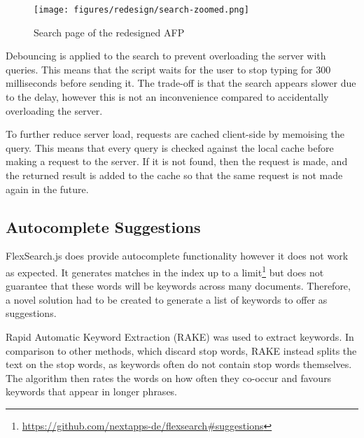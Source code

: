\documentclass[bsc,frontabs,oneside,singlespacing,parskip,deptreport,logo]{infthesis}
\begin{document}
\begin{figure}[h]
    \centering
    \texttt{[image: figures/redesign/search-zoomed.png]}
    \caption{Search page of the redesigned AFP}
    \label{fig:search-redesign}
\end{figure}

Debouncing is applied to the search to prevent overloading the server with queries. This means that the script waits for the user to stop typing for 300 milliseconds before sending it. The trade-off is that the search appears slower  due to the delay,  however this is not an inconvenience compared to accidentally overloading the server.

To further reduce server load, requests are cached client-side by memoising the query. This means that every query is checked against the local cache before making a request to the server. If it is not found, then the request is made, and the returned result is added to the cache so that the same request is not made again in the future.


\subsection{Autocomplete Suggestions} \label{autocomplete}


FlexSearch.js does provide autocomplete functionality however it does not work as expected. It generates matches in the index up to a limit\footnote{\url{https://github.com/nextapps-de/flexsearch\#suggestions}} but does not guarantee that these words will be keywords across many documents. Therefore, a novel solution had to be created to generate a list of keywords to offer as suggestions. 

Rapid Automatic Keyword Extraction (RAKE) \cite{RAKE} was used to extract keywords. In comparison to other methods, which discard stop words, RAKE instead splits the text on the stop words, as keywords often do not contain stop words themselves. The algorithm then rates the words on how often they co-occur and favours keywords that appear in longer phrases.
\end{document}
